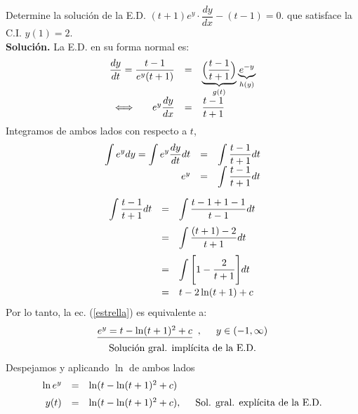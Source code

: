 \documentclass{beamer}
\begin{document}
\begin{frame}[t]
	\begin{example}
		Determine la solución de la E.D. \((t+1) e^y \cdot  \dfrac{dy}{dx} -(t-1) =0\). que satisface la C.I. \(y(1) =2\).\\[2mm]
		\textbf{Solución.} La E.D. en su forma normal es:
		\[
			\begin{array}{rcl}
				\dfrac{dy}{dt} = \dfrac{t-1}{e^y(t+1)} &=& \underbrace{\Big(\dfrac{t-1}{t+1}\Big)} _{g(t)} \underbrace{e^{-y}}_{h(y)} \\[2mm]
				\iff \hspace{5mm} e^y \dfrac{dy}{dx} & = & \dfrac{t-1}{t+1}
			\end{array}
		\]
		Integramos de ambos lados con respecto a \(t\),
		\begin{equation}
			\begin{array}{rcl}
				\displaystyle\int e^ydy = \displaystyle\int e^y \dfrac{dy}{dt} dt & = & \displaystyle\int \dfrac{t-1}{t+1} dt \\[2mm]
				e^y & = & \displaystyle\int \dfrac{t-1}{t+1} dt \label{estrella}
			\end{array}
		\end{equation}
	\end{example}
\end{frame}

\begin{frame}[t]
	\vspace{-4mm}
	\begin{exampleblock}{}
		\[
			\begin{array}{rcl}
				\displaystyle\int \dfrac{t-1}{t+1} dt & = & \displaystyle\int \dfrac{t-1+1-1}{t-1} dt \\[4mm]
				& = & \displaystyle\int \dfrac{(t+1) -2}{t+1} dt \\[4mm]
				& = & \displaystyle\int \Bigg[1- \dfrac{2}{t+1}\Bigg] dt \\[4mm]
				& = & t-2\ln(t+1) +c
			\end{array}
		\]
		Por lo tanto, la ec. (\ref{estrella}) es equivalente a:
		\[
			\begin{array}{c}
				\underline{e^y = t-\ln(t+1) ^2+c} \;\;,\hspace{5mm} y \in (-1, \infty) \\[2mm]
				\mbox{Solución gral. implícita de la E.D.}
			\end{array}
		\]
		Despejamos y aplicando \(\ln\) de ambos lados
		\[
			\begin{array}{rcl}
				\ln e^y & = & \ln (t- \ln (t+1) ^2+c) \\[2mm]
				y(t) & = & \ln (t- \ln (t+1) ^2+c), \hspace{5mm} \mbox{Sol. gral. explícita de la E.D.}
			\end{array}
		\]
	\end{exampleblock}
\end{frame}
\end{document}
